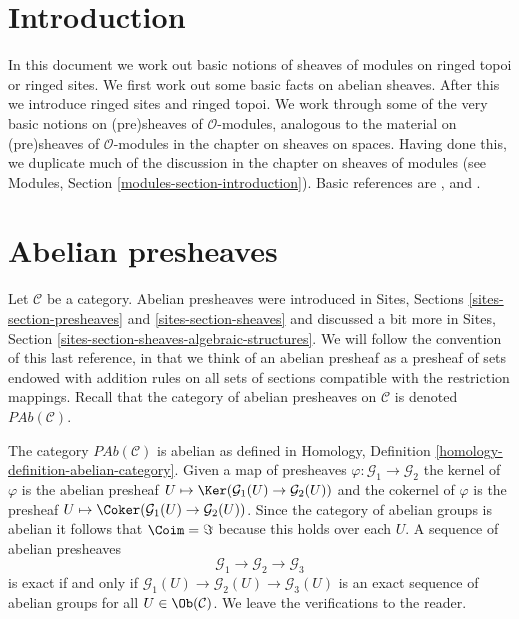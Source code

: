 \section{Introduction}
\label{sites-modules-section-introduction}
In this document we work out basic notions of sheaves of modules on
ringed topoi or ringed sites. We first work out some basic facts on
abelian sheaves. After this we introduce ringed sites and ringed topoi.
We work through some of the very basic notions on (pre)sheaves of
$\mathcal{O}$-modules, analogous to the material on (pre)sheaves of
$\mathcal{O}$-modules in the chapter on sheaves on spaces.
Having done this, we duplicate much of the discussion in the chapter on
sheaves of modules (see Modules, Section \ref{modules-section-introduction}).
Basic references are \cite{FAC}, \cite{EGA} and \cite{SGA4}.

\section{Abelian presheaves}
\label{sites-modules-section-abelian-pre-sheaves}
Let $\mathcal{C}$ be a category.
Abelian presheaves were introduced in
Sites, Sections \ref{sites-section-presheaves}
and \ref{sites-section-sheaves} and discussed a bit more
in Sites, Section \ref{sites-section-sheaves-algebraic-structures}.
We will follow the convention of this last reference, in that we think
of an abelian presheaf as a presheaf of sets endowed with addition rules
on all sets of sections compatible with the restriction mappings.
Recall that the category of abelian presheaves on $\mathcal{C}$
is denoted $\textit{PAb}(\mathcal{C})$.

\medskip\noindent
The category $\textit{PAb}(\mathcal{C})$ is abelian as defined in
Homology, Definition \ref{homology-definition-abelian-category}.
Given a map of presheaves $\varphi : \mathcal{G}_1 \to \mathcal{G}_2$
the kernel of $\varphi$ is the abelian presheaf
$U \mapsto \Ker(\mathcal{G}_1(U) \to \mathcal{G}_2(U))$ and
the cokernel of $\varphi$ is the presheaf
$U \mapsto \Coker(\mathcal{G}_1(U) \to \mathcal{G}_2(U))$.
Since the category of abelian groups is abelian it follows that
$\Coim = \Im$ because this holds over each $U$.
A sequence of abelian presheaves
$$
\mathcal{G}_1 \longrightarrow
\mathcal{G}_2 \longrightarrow
\mathcal{G}_3
$$
is exact if and only if
$\mathcal{G}_1(U) \to \mathcal{G}_2(U) \to \mathcal{G}_3(U)$
is an exact sequence of abelian groups for all $U \in \Ob(\mathcal{C})$.
We leave the verifications to the reader.

